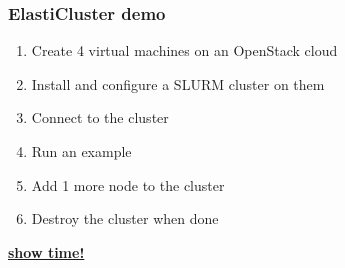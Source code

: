 \documentclass[english,serif,mathserif,usenames,dvipsnames]{beamer}
\begin{document}
\begin{frame}
  \frametitle{ElastiCluster demo}

  \begin{enumerate}
  \item Create 4 virtual machines on an OpenStack cloud
  \item Install and configure a SLURM cluster on them
  \item Connect to the cluster
  \item Run an example
  \item Add 1 more node to the cluster
  \item Destroy the cluster when done
  \end{enumerate}

  \+
  \begin{center}
    \Large
    \href{http://www.youtube.com/watch?v=DDm6-QEnNsU}{\textbf{show time!}}
  \end{center}
\end{frame}
\end{document}
